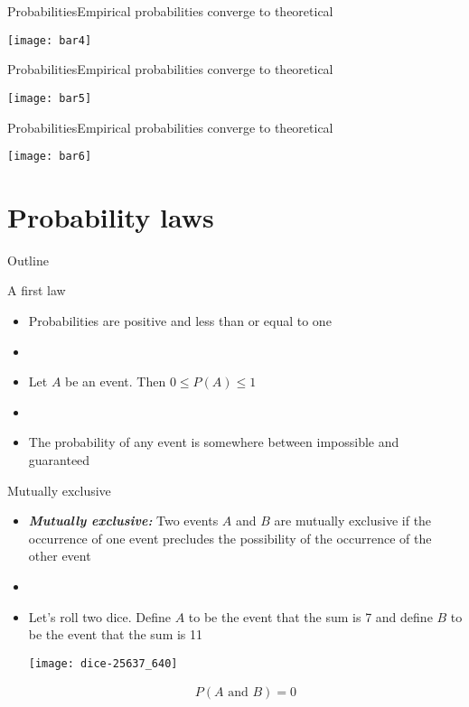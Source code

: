 \documentclass[xcolor=dvipsnames]{beamer}
\begin{document}
\begin{frame}{Probabilities}{Empirical probabilities converge to theoretical}
\begin{center}
	\texttt{[image: bar4]}
\end{center}
\end{frame}

\begin{frame}{Probabilities}{Empirical probabilities converge to theoretical}
\begin{center}
	\texttt{[image: bar5]}
\end{center}
\end{frame}

\begin{frame}{Probabilities}{Empirical probabilities converge to theoretical}
\begin{center}
	\texttt{[image: bar6]}
\end{center}
\end{frame}

\section{Probability laws}
\begin{frame}{Outline}
\tableofcontents[currentsection,subsectionstyle=show/shaded/hide]
\end{frame}

\begin{frame}{A first law}
	\begin{itemize}
		\item Probabilities are positive and less than or equal to one \pause
		\item[]
		\item Let $A$ be an event. Then $0 \leq P(A) \leq 1$ \pause
		\item[]
		\item The probability of any event is somewhere between impossible and guaranteed
	\end{itemize}
\end{frame}

\begin{frame}{Mutually exclusive}
	\begin{itemize}
		\item \textbf{\emph{Mutually exclusive:}} Two events $A$ and $B$ are mutually exclusive if the occurrence of one event precludes the possibility of the occurrence of the other event \pause
		\item[]
		\item Let's roll two dice. Define $A$ to be the event that the sum is 7 and define $B$ to be the event that the sum is 11 \pause
		\begin{center}
			\texttt{[image: dice-25637\_640]}
		\end{center}
		\begin{gather*}
			P(A \text{ and } B) = 0
		\end{gather*}
	\end{itemize}
\end{frame}
\end{document}

